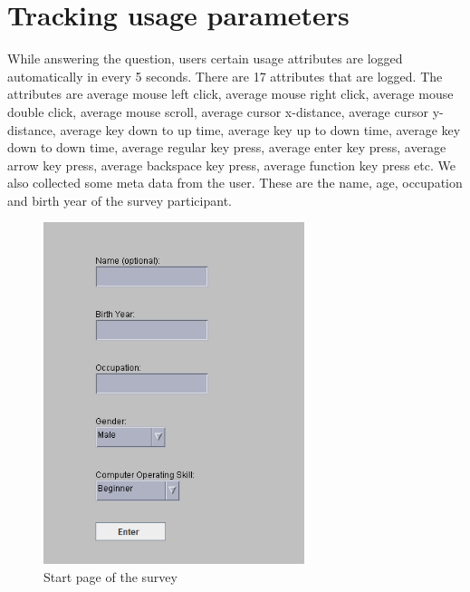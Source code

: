 
\chapter{Tracking usage parameters}
While answering the question, users certain usage attributes are logged automatically in every 5 seconds. There are 17 attributes that are logged. The attributes are average mouse left click, average mouse right click, average mouse double click, average mouse scroll, average cursor x-distance, average cursor y-distance, average key down to up time, average key up to down time, average key down to down time, average regular key press, average enter key press, average arrow key press, average backspace key press, average function key press etc. We also collected some meta data from the user. These are the name, age, occupation and birth year of the survey participant.

\begin{figure}
\centering
\includegraphics[width=3in,clip,keepaspectratio]{Chapters/figures/startPageSurvey.png}
\caption{Start page of the survey}
\label{Optional }
\end{figure}


